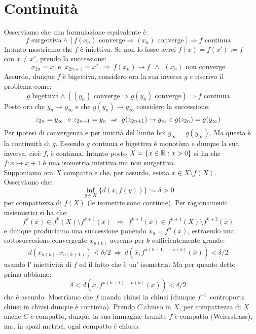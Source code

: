 \section{Continuità}

 Osserviamo che una formulazione equivalente è:
$$ f\mbox{ surgettiva} \wedge \left[ f(x_n)\mbox{ converge} \Rightarrow (x_n) \mbox{ converge} \right] \Rightarrow f \mbox{ continua} $$
Intanto mostriamo che $f$ è iniettiva. Se non lo fosse avrei $f(x)=f(x'):=f$ con $x\neq x'$, prendo la successione:
$$ x_{2n}=x\ \mbox{ e }\ x_{2n+1}=x'\ \ \Rightarrow\ f(x_n)\rightarrow f\ \  \wedge\ \ (x_n) \mbox{ non converge} $$
Assurdo, dunque $f$ è bigettiva, considero ora la sua inversa $g$ e riscrivo il problema come:
$$ g\mbox{ bigettiva} \wedge \left( (y_n)\mbox{ converge} \Rightarrow g(y_n) \mbox{ converge} \right) \Rightarrow f \mbox{ continua} $$
Posto ora che $y_n\rightarrow y_{\infty}$ e che $g(y_n)\rightarrow g_{\infty}$ considero la successione:
$$ z_{2n}=y_{\infty}\  \mbox{ e}\  z_{2n+1}=y_n\ \Rightarrow\  g(z_{2n+1})\rightarrow g_{\infty}\\ \mbox{ e}\  g(z_{2n})=g(y_{\infty}) $$
Per ipotesi di convergenza e per unicità del limite ho: $ g_{\infty}=g(y_{\infty})$. Ma questa è la continuità di $g$. Essendo $g$ continua e bigettiva è monotòna e dunque la sua inversa, cioè $f$, è continua.
 Intanto posto $X=\{x\in \mathbb{R} : x>0\}$ si ha che $f: x\mapsto x+1$ è una isometria iniettiva ma non surgettiva.\\
Supponiamo ora $X$ compatto e che, per assurdo, esista $\overline{x}\in X\setminus f(X)$. Osserviamo che:
$$
\inf_{y\in X}\{d(\overline{x},f(y))\}:=\delta>0
$$
per compattezza di $f(X)$ (le isometrie sono continue). Per ragionamenti insiemistici si ha che:
$$
f^k(\overline{x}) \in f^k(X)\setminus f^{k+1}(\overline{x})\ \ \Rightarrow \ \ f^{k+1}(\overline{x}) \in f^{k+1}(X)\setminus f^{k+2}(\overline{x})
$$
e dunque produciamo una successione ponendo $x_n=f^{n}(\overline{x})$, estraendo una sottosuccesione convergente $x_{n(k)}$ avremo per $k$ sufficientemente grande:
$$
d(x_{n(k)},x_{n(k+1)})<\delta /2 \ \Rightarrow \ d(\overline{x}, f^{n(k+1)-n(k)}(\overline{x}))<\delta /2
$$
usando l' iniettività di $f$ ed il fatto che è un' isometria. Ma per quanto detto prima abbiamo:
$$
\delta < d(\overline{x}, f^{n(k+1)-n(k)}(\overline{x}))<\delta /2
$$ 
che è assurdo.
Mostriamo che $f$ manda chiusi in chiusi (dunque $f^{-1}$ controporta chiusi in chiusi dunque è continua). Prendo $C$ chiuso in $X$, per compattezza di $X$ anche $C$ è compatto, dunque la sua immagine tramite $f$ è compatta (Weierstrass), ma, in spazi metrici, ogni compatto è chiuso. 

